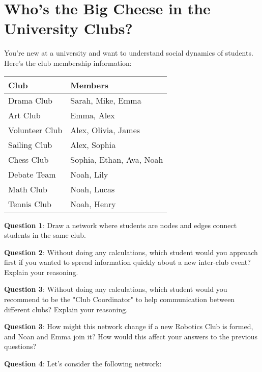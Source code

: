 \documentclass[a4paper, 14pt]{extarticle}
\begin{document}
\section*{Who's the Big Cheese in the University Clubs?}

You're new at a university and want to understand social dynamics of students. Here's the club membership information:

\begin{center}
\begin{tabular}{|l|l|}
    \hline
    \textbf{Club} & \textbf{Members} \\
    \hline
    Drama Club & Sarah, Mike, Emma \\
    Art Club & Emma, Alex \\
    Volunteer Club & Alex, Olivia, James \\
    Sailing Club & Alex, Sophia \\
    Chess Club & Sophia, Ethan, Ava, Noah \\
    Debate Team & Noah, Lily \\
    Math Club & Noah, Lucas \\
    Tennis Club & Noah, Henry \\
    \hline
\end{tabular}
\end{center}

{\bf Question 1}:
Draw a network where students are nodes and edges connect students in the same club.

\clearpage

{\bf Question 2}:
Without doing any calculations, which student would you approach first if you wanted to spread information quickly about a new inter-club event? Explain your reasoning.

\vspace{8em}
{\bf Question 3}:
Without doing any calculations, which student would you recommend to be the "Club Coordinator" to help communication between different clubs? Explain your reasoning.

\vspace{8em}
{\bf Question 3}:
How might this network change if a new Robotics Club is formed, and Noan and Emma join it? How would this affect your answers to the previous questions?

\clearpage

{\bf Question 4}: Let's consider the following network:
\end{document}
